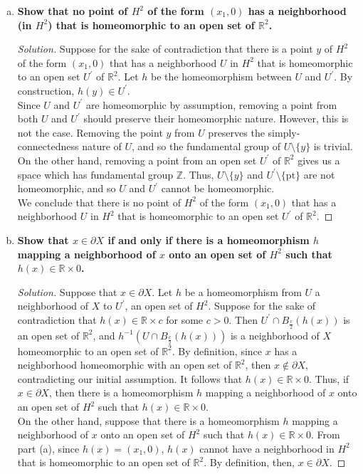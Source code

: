 \documentclass[11pt]{article}
\newcommand{\R}{\mathbb{R}}
\newcommand{\Z}{\mathbb{Z}}
\newenvironment{solution}
  {\renewcommand\qedsymbol{$\blacksquare$}\begin{proof}[Solution]}
  {\end{proof}}
\begin{document}
\begin{enumerate}[a)]
    \item \textbf{Show that no point of $H^2$ of the form $(x_1, 0)$ has a neighborhood (in $H^2$) that is homeomorphic to an open set of $\R^2$.}
    \begin{solution}
    Suppose for the sake of contradiction that there is a point $y$ of $H^2$ of the form $(x_1, 0)$ that has a neighborhood $U$ in $H^2$ that is homeomorphic to an open set $U^{\prime}$ of $\R^2$.  
    Let $h$ be the homeomorphism between $U$ and $U^{\prime}$. By construction, $h(y) \in U^{\prime}$. \\

    Since $U$ and $U^{\prime}$ are homeomorphic by assumption, removing a point from both $U$ and $U^{\prime}$ should preserve their homeomorphic nature. 
    However, this is not the case. Removing the point $y$ from $U$ preserves the simply-connectedness nature of $U$, and so the fundamental group of $U \setminus \{ y \}$ is trivial. 
    On the other hand, removing a point from an open set $U^{\prime}$ of $\R^2$ gives us a space which has fundamental group $\Z$. Thus, $U \setminus \{ y\}$ and $U^{\prime} \setminus \{\text{pt}\}$ are not homeomorphic, and
    so $U$ and $U^{\prime}$ cannot be homeomorphic. \\

    We conclude that there is no point of $H^2$ of the form $(x_1, 0)$ that has a neighborhood $U$ in $H^2$ that is homeomorphic to an open set $U^{\prime}$ of $\R^2$.  
    \end{solution}
    
    \item \textbf{Show that $x \in \partial X$ if and only if there is a homeomorphism $h$ mapping a neighborhood of $x$ onto an open set of $H^2$ such that $h(x) \in \R \times 0$.}
    \begin{solution}
    
    Suppose that $x \in \partial X$. Let $h$ be a homeomorphism from $U$ a neighborhood of $X$ to $U^{\prime}$, an open set of $H^2$. Suppose
    for the sake of contradiction that $h(x) \in \R \times c$ for some $c > 0$. Then $U^{\prime} \cap B_{\frac{c}{2}}(h(x))$ is an open set of $\R^2$, and 
    $h^{-1}(U \cap B_{\frac{c}{2}}(h(x)))$ is a neighborhood of $X$ homeomorphic to an open set of $\R^2$. By definition, since $x$ has a neighborhood homeomorphic
    with an open set of $\R^2$, then $x \notin \partial X$, contradicting our initial assumption. It follows that $h(x) \in \R \times 0$.
    Thus, if $x \in \partial X$, then there is a homeomorphism $h$ mapping a neighborhood of $x$ onto an open set of $H^2$ such that $h(x) \in \R \times 0$. \\
    
    On the other hand, suppose that there is a homeomorphism $h$ mapping a neighborhood of $x$ onto an open set of $H^2$ such that $h(x) \in \R \times 0$. From part (a),
    since $h(x) = (x_1, 0)$, $h(x)$ cannot have a neighborhood in $H^2$ that is homeomorphic to an open set of $\R^2$. By definition, then, $x \in \partial X$.
    \end{solution}
\end{enumerate}
\end{document}
